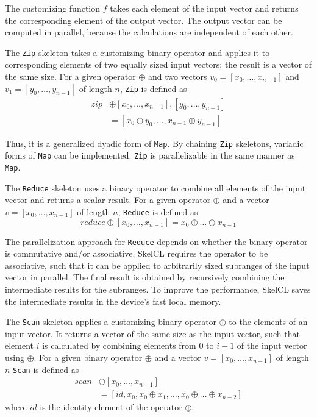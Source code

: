 The customizing function $f$ takes each element of the input vector and returns the corresponding element of the output vector.
The output vector can be computed in parallel, because the calculations are independent of each other.

The \texttt{Zip} skeleton takes a customizing binary operator and applies it to corresponding elements of two equally sized input vectors;
the result is a vector of the same size.
For a given operator $\oplus$ and two vectors $v_{0} = [x_0, \ldots, x_{n-1}]$ and $v_{1} = [y_0, \ldots, y_{n-1}]$ of length $n$, \texttt{Zip} is defined as
\begin{equation}
\begin{split}
zip	& \oplus [x_0, \ldots, x_{n-1}], [y_0, \ldots, y_{n-1}]\\
	& = [x_0 \oplus y_0, \ldots, x_{n-1} \oplus y_{n-1}]
\end{split}
\end{equation}

Thus, it is a generalized dyadic form of \texttt{Map}.
By chaining \texttt{Zip} skeletons, variadic forms of \texttt{Map} can be implemented.
\texttt{Zip} is parallelizable in the same manner as \texttt{Map}.

The \texttt{Reduce} skeleton uses a binary operator to combine all elements of the input vector and returns a scalar result.
For a given operator $\oplus$ and a vector $v = [x_0, \ldots, x_{n-1}]$ of length $n$, \texttt{Reduce} is defined as
\begin{equation}
reduce \oplus [x_0, \ldots, x_{n-1}] = x_0 \oplus \ldots \oplus x_{n-1}
\end{equation}

The parallelization approach for \texttt{Reduce} depends on whether the binary operator is commutative and/or associative.
SkelCL requires the operator to be associative, such that it can be applied to arbitrarily sized subranges of the input vector in parallel.
The final result is obtained by recursively combining the intermediate results for the subranges.
To improve the performance, SkelCL saves the intermediate results in the device's fast local memory.

The \texttt{Scan} skeleton applies a customizing binary operator $\oplus$ to the elements of an input vector.
It returns a vector of the same size as the input vector, such that element $i$ is calculated by combining elements from 0 to $i-1$ of the input vector using $\oplus$.
For a given binary operator $\oplus$ and a vector $v = [x_0, \ldots, x_{n-1}]$ of length $n$ \texttt{Scan} is defined as
\begin{equation}
\begin{split}
scan	& \oplus [x_0, \ldots, x_{n-1}]\\
	& = [id, x_0, x_0 \oplus x_1, \ldots, x_0 \oplus \ldots \oplus x_{n-2}]
\end{split}
\end{equation}
where $id$ is the identity element of the operator $\oplus$.


